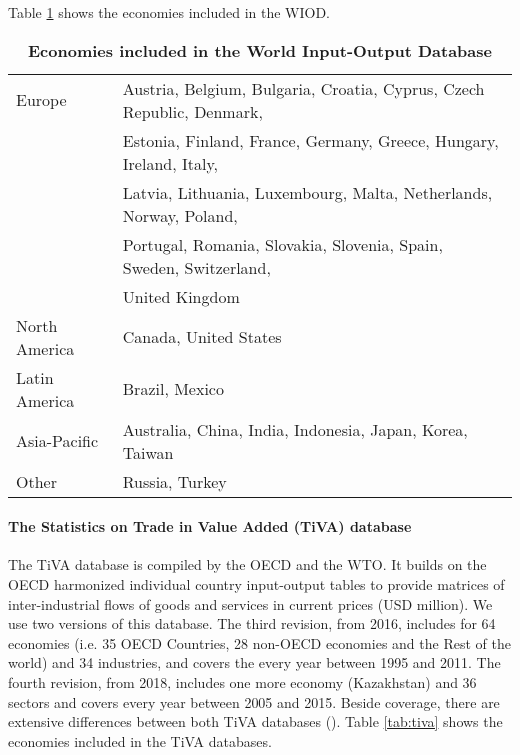 \documentclass[11pt,a4paper]{article}
\begin{document}
Table \ref{tab:wiod} shows the economies included in the WIOD.
 
 
\begin{table}[!h]
\begin{threeparttable}
\centering
\centering
\caption{\small{\textbf{Economies included in the World Input-Output Database}}}
\small
\begin{tabular}{ll}
\hline\hline
Europe & Austria, Belgium, Bulgaria, Croatia, Cyprus, Czech Republic, Denmark,\\
& Estonia, Finland, France, Germany, Greece, Hungary, Ireland, Italy,\\
& Latvia, Lithuania, Luxembourg, Malta, Netherlands, Norway, Poland,\\
&Portugal, Romania, Slovakia, Slovenia, Spain, Sweden, Switzerland,\\
& United Kingdom\\
North  America& Canada, United States\\
Latin America & Brazil, Mexico \\
Asia-Pacific & Australia, China, India, Indonesia, Japan, Korea, Taiwan\\
Other & Russia, Turkey\\
\hline\hline
\end{tabular} 
\label{tab:wiod}
\end{threeparttable}
\end{table} 

\paragraph{The Statistics on Trade in Value Added (TiVA) database}
The TiVA database is compiled by the OECD and the WTO. It builds on the OECD harmonized individual country input-output tables to provide matrices of inter-industrial flows of goods and services in current prices (USD million).
We use two versions of this database. The third revision, from 2016, includes for 64 economies (i.e. 35 OECD Countries, 28 non-OECD economies and the Rest of the world) and 34 industries, and covers the every year between 1995 and 2011.
The fourth revision, from 2018, includes one more economy (Kazakhstan) and 36 sectors and covers every year between 2005 and 2015.
Beside coverage, there are extensive differences between both TiVA databases (\cite{OECD2018}).
Table \ref{tab:tiva} shows the economies included in the TiVA databases.
\end{document}
